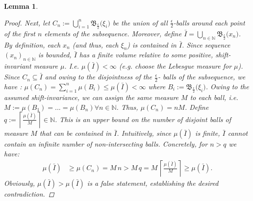 \documentclass{article} %
\newtheorem{lem}[thm]{Lemma}
\theoremstyle{definition}
\theoremstyle{remark}
\newcommand{\nat}{\mathbb N}
\newcommand{\vc}[1]{#1}
\newcommand{\ball}[2]{\ensuremath{\mathfrak B_{\vc{#1}} \bigl( #2\bigr) }}
\newcommand{\ceil}[1]{ \left\lceil #1 \right\rceil }
\begin{document}
\begin{lem}
\begin{proof}
Next, let $C_n := \bigcup_{i =1}^n \ball{\frac \epsilon 2}{\xi_i} $ be the union of all $\frac \epsilon 2$-balls around each point of the first $n$ elements of the subsequence. Moreover,  define $\bar I = \bigcup_{n \in \nat} \ball{\frac \epsilon 2}{x_n} $.
By definition, each $x_n$ (and thus, each $\xi_n$) is contained in $\bar I$.
Since sequence $(x_n)_{n \in \nat}$ is bounded, $\bar I $ has a finite volume relative to some positive, shift-invariant measure $\mu$. I.e. $\mu(\bar I) < \infty$ (e.g. choose the Lebesgue measure for $\mu$). 
Since $C_n \subseteq \bar I$ and owing to the disjointness of the $\frac \epsilon 2$- balls of the subsequence,  we have :
 $\mu(C_n) = \sum_{i=1}^n \mu(B_i) \leq \mu(\bar I)< \infty$ where $B_i := \ball{\frac \epsilon 2}{\xi_i}$. Owing to the assumed shift-invariance, we can assign the same measure $M$ to each ball, i.e. $M:=\mu(B_1) =...= \mu(B_n)\forall n \in \nat$. Thus, $\mu(C_n) = n M$.
Define $q:= \ceil{\frac{\mu(\bar I)}{M}} \in \nat$. This is an upper bound on the number of disjoint balls of measure $M$  that can be contained in $\bar I$. Intuitively, since $\mu(\bar I)$ is finite, $\bar I$ cannot contain an infinite number of non-intersecting balls. 
Concretely, for  $n > q$ we have:
\begin{align}
\mu(\bar I) &\geq \mu(C_n) = M \, n  > M \, q = M \,  \ceil{\frac{\mu(\bar I)}{M}} \geq \mu(\bar I).
 \end{align}
Obviously, $\mu(\bar I) > \mu(\bar I)$ is a false statement, establishing the desired contradiction.

\end{proof}
\label{lem:bndseq_entails_distgridvanish}



\end{lem}
\end{document}
